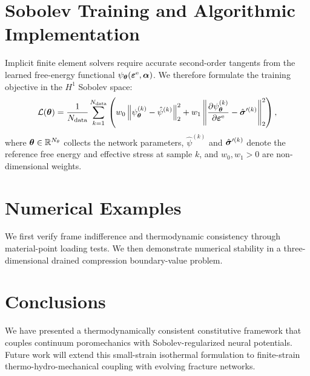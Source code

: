\documentclass[11pt,a4paper]{article}
\begin{document}
\section{Sobolev Training and Algorithmic Implementation}
\label{sec:implementation}

Implicit finite element solvers require accurate second-order tangents from the learned free-energy functional $\psi_{\boldsymbol{\theta}}(\boldsymbol{\varepsilon}^{\mathrm{e}}, \boldsymbol{\alpha})$. We therefore formulate the training objective in the $H^1$ Sobolev space:
\begin{equation}
  \mathcal{L}(\boldsymbol{\theta}) = \frac{1}{N_{\mathrm{data}}} \sum_{k=1}^{N_{\mathrm{data}}} \left( w_{0} \left\lVert \psi_{\boldsymbol{\theta}}^{(k)} - \hat{\psi}^{(k)} \right\rVert_{2}^{2} + w_{1} \left\lVert \frac{\partial \psi_{\boldsymbol{\theta}}^{(k)}}{\partial \boldsymbol{\varepsilon}^{\mathrm{e}}} - \hat{\boldsymbol{\sigma}}'^{(k)} \right\rVert_{2}^{2} \right),
  \label{eq:sobolev_loss}
\end{equation}
where $\boldsymbol{\theta} \in \mathbb{R}^{N_{\theta}}$ collects the network parameters, $\hat{\psi}^{(k)}$ and $\hat{\boldsymbol{\sigma}}'^{(k)}$ denote the reference free energy and effective stress at sample $k$, and $w_{0}, w_{1} > 0$ are non-dimensional weights.

\section{Numerical Examples}
\label{sec:examples}

We first verify frame indifference and thermodynamic consistency through material-point loading tests. We then demonstrate numerical stability in a three-dimensional drained compression boundary-value problem.

\section{Conclusions}
\label{sec:conclusion}

We have presented a thermodynamically consistent constitutive framework that couples continuum poromechanics with Sobolev-regularized neural potentials. Future work will extend this small-strain isothermal formulation to finite-strain thermo-hydro-mechanical coupling with evolving fracture networks.
\end{document}
